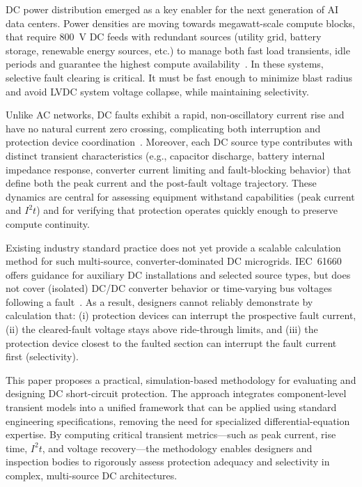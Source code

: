 \documentclass[conference]{IEEEtran}
\begin{document}
 DC power distribution emerged as a key enabler for the next generation of AI data centers. Power densities are moving towards megawatt-scale compute blocks, that require 800~V DC feeds with redundant sources (utility grid, battery storage, renewable energy sources, etc.) to manage both fast load transients, idle periods and guarantee the highest compute availability~\cite{nvidia_800vdc}. In these systems, selective fault clearing is critical. It must be fast enough to minimize blast radius and avoid LVDC system voltage collapse, while maintaining selectivity.

 Unlike AC networks, DC faults exhibit a rapid, non-oscillatory current rise and have no natural current zero crossing, complicating both interruption and protection device coordination~\cite{ravyts_fuse,cairoli_sscb_review}. Moreover, each DC source type contributes with distinct transient characteristics (e.g., capacitor discharge, battery internal impedance response, converter current limiting and fault-blocking behavior) that define both the peak current and the post-fault voltage trajectory. These dynamics are central for assessing equipment withstand capabilities (peak current and $I^2t$) and for verifying that protection operates quickly enough to preserve compute continuity.

 Existing industry standard practice does not yet provide a scalable calculation method for such multi-source, converter-dominated DC microgrids. IEC~61660 offers guidance for auxiliary DC installations and selected source types, but does not cover (isolated) DC/DC converter behavior or time-varying bus voltages following a fault~\cite{iec61660}. As a result, designers cannot reliably demonstrate by calculation that:
 (i) protection devices can interrupt the prospective fault current,
 (ii) the cleared-fault voltage stays above ride-through limits, and
 (iii) the protection device closest to the faulted section can interrupt the fault current first (selectivity).

 This paper proposes a practical, simulation-based methodology for evaluating and designing DC short-circuit protection. The approach integrates component-level transient models into a unified framework that can be applied using standard engineering specifications, removing the need for specialized differential-equation expertise. By computing critical transient metrics---such as peak current, rise time, $I^2t$, and voltage recovery---the methodology enables designers and inspection bodies to rigorously assess protection adequacy and selectivity in complex, multi-source DC architectures.
\end{document}
